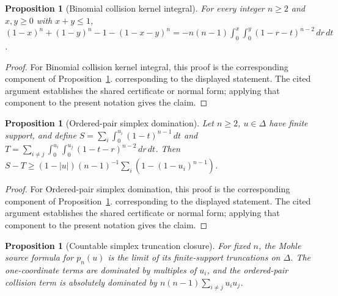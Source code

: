 \documentclass[11pt]{article}
\numberwithin{equation}{section}
\newtheorem{proposition}[theorem]{Proposition}
\theoremstyle{definition}
\theoremstyle{remark}
\newcommand{\1}{\mathbf 1}
\begin{document}
\begin{proposition}[Binomial collision kernel integral]
\label{res:mohle-binomialcollisionkernel-integral}
For every integer \(n\ge2\) and \(x,y\ge0\) with \(x+y\le1\), \((1-x)^n+(1-y)^n-1-(1-x-y)^n=-n(n-1)\int_0^x\int_0^y(1-r-t)^{n-2}\,dr\,dt\).
\end{proposition}

\begin{proof}
For Binomial collision kernel integral, this proof is the corresponding component of Proposition~\ref{res:mohle-countablesimplex-truncationclosure}.  corresponding to the displayed statement.  The cited argument establishes the shared certificate or normal form; applying that component to the present notation gives the claim.
\end{proof}

\begin{proposition}[Ordered-pair simplex domination]
\label{res:mohle-orderedpair-simplex-domination}
Let \(n\ge2\), \(u\in\Delta\) have finite support, and define \(S=\sum_i\int_0^{u_i}(1-t)^{n-1}\,dt\) and \(T=\sum_{i\ne j}\int_0^{u_i}\int_0^{u_j}(1-t-r)^{n-2}\,dr\,dt\). Then \(S-T\ge(1-|u|)(n-1)^{-1}\sum_i(1-(1-u_i)^{n-1})\).
\end{proposition}

\begin{proof}
For Ordered-pair simplex domination, this proof is the corresponding component of Proposition~\ref{res:mohle-countablesimplex-truncationclosure}.  corresponding to the displayed statement.  The cited argument establishes the shared certificate or normal form; applying that component to the present notation gives the claim.
\end{proof}

\begin{proposition}[Countable simplex truncation closure]
\label{res:mohle-countablesimplex-truncationclosure}
For fixed \(n\), the Mohle source formula for \(p_n(u)\) is the limit of its finite-support truncations on \(\Delta\). The one-coordinate terms are dominated by multiples of \(u_i\), and the ordered-pair collision term is absolutely dominated by \(n(n-1)\sum_{i\ne j}u_i u_j\).
\end{proposition}
\end{document}
